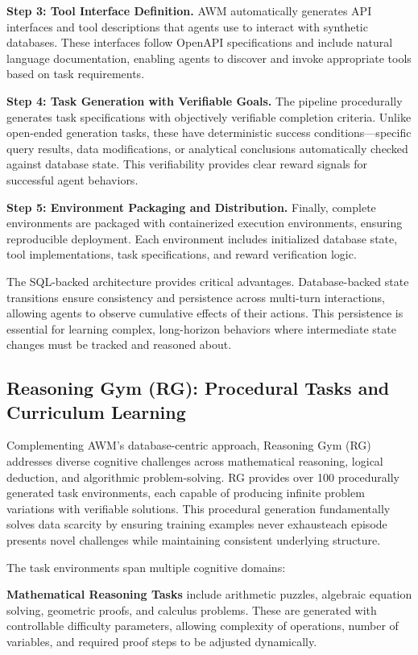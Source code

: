 \textbf{Step 3: Tool Interface Definition.} AWM automatically generates API interfaces and tool descriptions that agents use to interact with synthetic databases. These interfaces follow OpenAPI specifications and include natural language documentation, enabling agents to discover and invoke appropriate tools based on task requirements.

\textbf{Step 4: Task Generation with Verifiable Goals.} The pipeline procedurally generates task specifications with objectively verifiable completion criteria. Unlike open-ended generation tasks, these have deterministic success conditions---specific query results, data modifications, or analytical conclusions automatically checked against database state. This verifiability provides clear reward signals for successful agent behaviors.

\textbf{Step 5: Environment Packaging and Distribution.} Finally, complete environments are packaged with containerized execution environments, ensuring reproducible deployment. Each environment includes initialized database state, tool implementations, task specifications, and reward verification logic.

The SQL-backed architecture provides critical advantages. Database-backed state transitions ensure consistency and persistence across multi-turn interactions, allowing agents to observe cumulative effects of their actions. This persistence is essential for learning complex, long-horizon behaviors where intermediate state changes must be tracked and reasoned about.

\subsection{Reasoning Gym (RG): Procedural Tasks and Curriculum Learning}

Complementing AWM's database-centric approach, Reasoning Gym (RG) addresses diverse cognitive challenges across mathematical reasoning, logical deduction, and algorithmic problem-solving. RG provides over 100 procedurally generated task environments, each capable of producing infinite problem variations with verifiable solutions. This procedural generation fundamentally solves data scarcity by ensuring training examples never exhausteach episode presents novel challenges while maintaining consistent underlying structure.

The task environments span multiple cognitive domains:

\textbf{Mathematical Reasoning Tasks} include arithmetic puzzles, algebraic equation solving, geometric proofs, and calculus problems. These are generated with controllable difficulty parameters, allowing complexity of operations, number of variables, and required proof steps to be adjusted dynamically.

